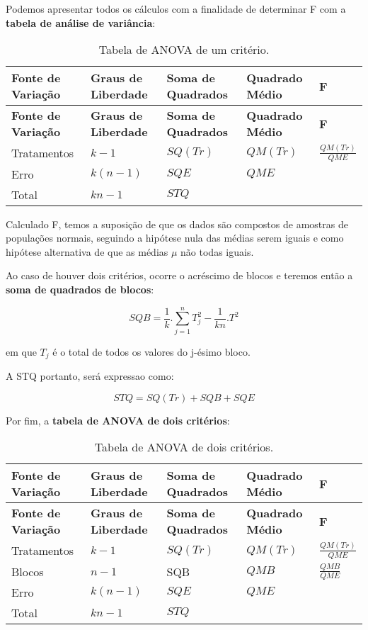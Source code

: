 \documentclass[
  openany]{book}
\begin{document}
Podemos apresentar todos os cálculos com a finalidade de determinar F com a \textbf{tabela de análise de variância}:

\begin{longtable}[]{@{}lllll@{}}
\caption{\label{tab:anova1} Tabela de ANOVA de um critério.}\tabularnewline
\toprule
\textbf{Fonte de Variação} & \textbf{Graus de Liberdade} & \textbf{Soma de Quadrados} & \textbf{Quadrado Médio} & \textbf{F}\tabularnewline
\midrule
\endfirsthead
\toprule
\textbf{Fonte de Variação} & \textbf{Graus de Liberdade} & \textbf{Soma de Quadrados} & \textbf{Quadrado Médio} & \textbf{F}\tabularnewline
\midrule
\endhead
Tratamentos & \(k-1\) & \(SQ(Tr)\) & \(QM(Tr)\) & \(\frac{QM(Tr)}{QME}\)\tabularnewline
Erro & \(k(n-1)\) & \(SQE\) & \(QME\) &\tabularnewline
Total & \(kn-1\) & \(STQ\) & &\tabularnewline
\bottomrule
\end{longtable}

Calculado F, temos a suposição de que os dados são compostos de amostras de populações normais, seguindo a hipótese nula das médias serem iguais e como hipótese alternativa de que as médias \(\mu\) não todas iguais.

Ao caso de houver dois critérios, ocorre o acréscimo de blocos e teremos então a \textbf{soma de quadrados de blocos}:

\begin{equation} 
SQB=\frac{1}{k}. \displaystyle \sum^n_{j=1} T^2_j-\frac{1}{kn}.T^2
  \label{eq:sqblocoss}
\end{equation}

em que \(T_j\) é o total de todos os valores do j-ésimo bloco.

A STQ portanto, será expressao como:

\begin{equation} 
STQ=SQ(Tr)+SQB+SQE
  \label{eq:sqtanova2crit}
\end{equation}

Por fim, a \textbf{tabela de ANOVA de dois critérios}:

\begin{longtable}[]{@{}lllll@{}}
\caption{\label{tab:anova2} Tabela de ANOVA de dois critérios.}\tabularnewline
\toprule
\textbf{Fonte de Variação} & \textbf{Graus de Liberdade} & \textbf{Soma de Quadrados} & \textbf{Quadrado Médio} & \textbf{F}\tabularnewline
\midrule
\endfirsthead
\toprule
\textbf{Fonte de Variação} & \textbf{Graus de Liberdade} & \textbf{Soma de Quadrados} & \textbf{Quadrado Médio} & \textbf{F}\tabularnewline
\midrule
\endhead
Tratamentos & \(k-1\) & \(SQ(Tr)\) & \(QM(Tr)\) & \(\frac{QM(Tr)}{QME}\)\tabularnewline
Blocos & \(n-1\) & SQB & \(QMB\) & \(\frac{QMB}{QME}\)\tabularnewline
Erro & \(k(n-1)\) & \(SQE\) & \(QME\) &\tabularnewline
Total & \(kn-1\) & \(STQ\) & &\tabularnewline
\bottomrule
\end{longtable}
\end{document}
